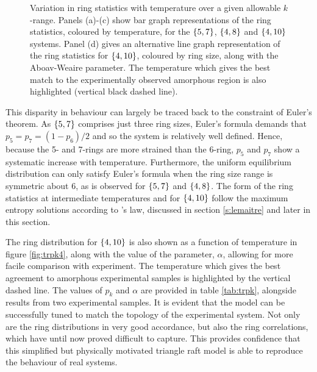 \begin{figure}[bt]
     \caption{Variation in ring statistics with temperature over a given allowable $k$\--range. Panels (a)-(c) show bar graph representations of the ring statistics, coloured by temperature, for the $\left\{5,7\right\}$, $\left\{4,8\right\}$ and $\left\{4,10\right\}$ systems. Panel (d) gives an alternative line graph representation of the ring statistics for $\left\{4,10\right\}$, coloured by ring size, along with the Aboav\--Weaire parameter. The temperature which gives the best match to the experimentally observed amorphous region is also highlighted (vertical black dashed line).}
     \label{fig:trpk}
\end{figure}

This disparity in behaviour can largely be traced back to the constraint of Euler's theorem. 
As $\left\{5,7\right\}$ comprises just three ring sizes, Euler's formula demands that $p_5=p_7=\left(1-p_6\right)/2$ and so the system is relatively well defined. 
Hence, because the 5\-- and 7\--rings are more strained than the 6\--ring, $p_5$ and $p_7$ show a systematic increase with temperature. 
Furthermore, the uniform equilibrium distribution can only satisfy Euler's formula when the ring size range is symmetric about 6, as is observed for $\left\{5,7\right\}$ and $\left\{4,8\right\}$. 
The form of the ring statistics at intermediate temperatures and for $\left\{4,10\right\}$ follow the maximum entropy solutions according to \lm's law, discussed in section \ref{s:lemaitre} and later in this section.

The ring distribution for $\left\{4,10\right\}$ is also shown as a function of temperature in figure \ref{fig:trpk4}, along with the value of the \aw{} parameter, $\alpha$, allowing for more facile comparison with experiment. 
The temperature which gives the best agreement to amorphous experimental samples is highlighted by the vertical dashed line. 
The values of $p_k$ and $\alpha$ are provided in table \ref{tab:trpk}, alongside results from two experimental samples. 
It is evident that the model can be successfully tuned to match the topology of the experimental system. 
Not only are the ring distributions in very good accordance, but also the ring correlations, which have until now proved difficult to capture. 
This provides confidence that this simplified but physically motivated triangle raft model is able to reproduce the behaviour of real systems.

